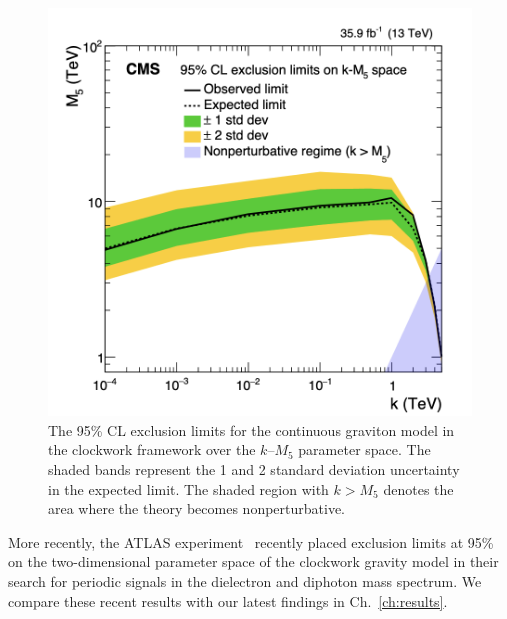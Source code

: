 \begin{figure}
    \centering
    \includegraphics[scale=0.5]{fig/ClockworkCMS.png}
    \caption{The 95\% CL exclusion limits for the continuous graviton model in the clockwork framework over the $k–M_5$ parameter space. The shaded bands represent the 1 and 2 standard deviation uncertainty in the expected limit. The shaded region with $k > M_5$ denotes the area where the theory becomes nonperturbative.}
    \label{fig:ClockworkCMS2016}
\end{figure}


More recently, the ATLAS experiment~\cite{ATLAS:2023hbp} recently placed exclusion limits at 95\% on the two-dimensional parameter space of the clockwork gravity model in their search for periodic signals in the dielectron and diphoton mass spectrum. We compare these recent results with our latest findings in Ch.~\ref{ch:results}.


